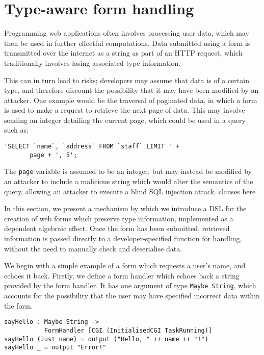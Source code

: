 \documentclass[preprint]{sigplanconf}
\begin{document}

\section{Type-aware form handling}
\label{form}
Programming web applications often involves processing user data, which may
then be used in further effectful computations. Data submitted using a form is
transmitted over the internet as a string as part of an HTTP request, which
traditionally involves losing associated type information.

This can in turn lead to risks; developers may assume that data is
of a certain type, and therefore discount the possibility that it may have been
modified by an attacker. One example would be the traversal of paginated data,
in which a form is used to make a request to retrieve the next page of data.
This may involve sending an integer detailing the current page, which could be
used in a query such as:

\begin{Verbatim}
'SELECT `name`, `address` FROM `staff` LIMIT ' + 
       page + ', 5';
\end{Verbatim}
The \texttt{page} variable is assumed to be an integer, but may instead be
modified by an attacker to include a malicious string which would alter the
semantics of the query, allowing an attacker to execute a blind SQL injection
attack. %
clauses here

In this section, we present a mechanism by which we introduce a DSL
for the creation of web forms which preserve type information, implemented
as a dependent algebraic effect. Once the form has
been submitted, retrieved information is passed directly to a
developer-specified function for handling, without the need to manually check
and deserialise data. 

We begin with a simple example of a form which requests a user's name, and
echoes it back. Firstly, we define a form handler which echoes back a string
provided by the form handler. It has one argument of type \texttt{Maybe
String}, which accounts for the possibility that the user may have specified
incorrect data within the form.

\begin{Verbatim}
sayHello : Maybe String -> 
           FormHandler [CGI (InitialisedCGI TaskRunning)]
sayHello (Just name) = output ("Hello, " ++ name ++ "!")
sayHello _ = output "Error!"
\end{Verbatim}
\end{document}
